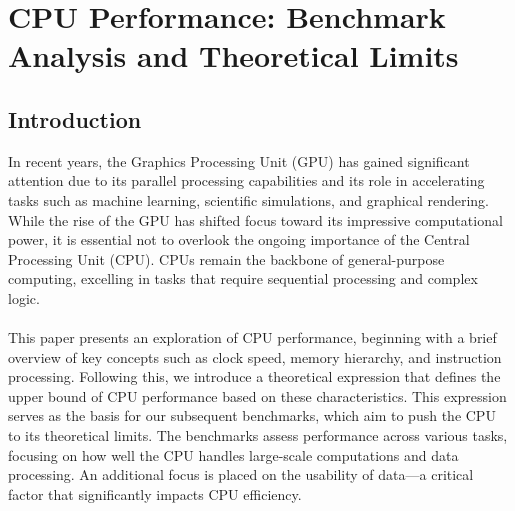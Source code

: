 \newpage

\section{CPU Performance: Benchmark Analysis and Theoretical Limits}

\subsection{Introduction}
In recent years, the Graphics Processing Unit (GPU) has gained significant attention due to its parallel 
processing capabilities and its role in accelerating tasks such as machine learning, scientific 
simulations, and graphical rendering. While the rise of the GPU has shifted focus toward its impressive 
computational power, it is essential not to overlook the ongoing importance of the Central Processing 
Unit (CPU). CPUs remain the backbone of general-purpose computing, excelling in tasks that require 
sequential processing and complex logic.
\par

\vspace{-1em}

\paragraph*{}
This paper presents an exploration of CPU performance, beginning with a brief overview of key concepts such 
as clock speed, memory hierarchy, and instruction processing. Following this, we introduce a theoretical 
expression that defines the upper bound of CPU performance based on these characteristics. This expression 
serves as the basis for our subsequent benchmarks, which aim to push the CPU to its theoretical limits. 
The benchmarks assess performance across various tasks, focusing on how well the CPU handles large-scale 
computations and data processing. An additional focus is placed on the usability of data—a critical factor 
that significantly impacts CPU efficiency.
\par
